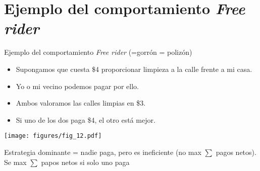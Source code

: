 \section[Ejemplo \emph{Free rider}]{Ejemplo del comportamiento \emph{Free rider}}

\begin{frame}{Ejemplo del comportamiento \emph{Free rider} (=gorrón = polizón)}
	\begin{multicols}{2}
		\begin{itemize}
			\item Supongamos que cuesta \$4 proporcionar limpieza a la calle frente a mi casa.
			\item Yo o mi vecino podemos pagar por ello.
			\item Ambos valoramos las calles limpias en \$3.
			\item Si uno de los dos paga \$4, el otro está  mejor.
		\end{itemize}
	
		\begin{center}
			\texttt{[image: figures/fig\_12.pdf]}
		\end{center}
	\end{multicols}
	
	Estrategia dominante = nadie paga, pero es ineficiente (no max $\sum$ pagos netos). Se max $\sum$ papos netos si solo uno paga
\end{frame}